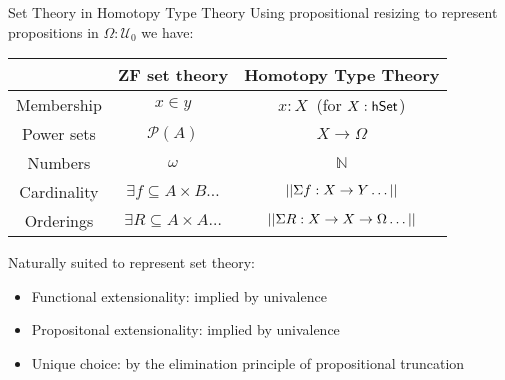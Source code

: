 \documentclass[xcolor=dvipsnames,compress,aspectratio=169]{beamer}
\newcommand{\MBB}[1]{\ensuremath{\mathbb{#1}}\xspace}  %
\newcommand{\MCL}[1]{\ensuremath{\mathcal{#1}}\xspace} %
\newcommand{\Nat}{\MBB{N}}   %
\newcommand{\Pow}{\MCL P}
\newcommand{\Prop}{\MBB P}
\begin{document}
\begin{frame}{Set Theory in Homotopy Type Theory}
	\vspace{0.2cm}
	Using propositional resizing to represent propositions in $\Omega:\mathcal{U}_0$ we have:

	\vspace{0.2cm}
	\begin{center}
	\begin{tabular}{c|c|c}
				&ZF set theory&Homotopy Type Theory\\\hline
				\vphantom{\vdots}Membership&$x\in y$&$x:X~$ (for $X:\mathsf{hSet}$)\\[0.2cm]
				Power sets&$\Pow(A)$&$X\to\Omega$\\[0.2cm]
				Numbers&$\omega$&$\Nat$\\[0.2cm]
				Cardinality&$\exists f\subseteq A\times B\dots$&$||\Sigma f:X\to Y\dots||$\\[0.2cm]
				Orderings&$\exists R\subseteq A\times A\dots$&$||\Sigma R:X\to X\to\Omega\dots||$
	\end{tabular}
	\end{center}
	
	\pause
	\vspace{0.2cm}
	Naturally suited to represent set theory:
	\begin{itemize}
	\item Functional extensionality: implied by univalence
	\item Propositonal extensionality: implied by univalence
	\item Unique choice: by the elimination principle of propositional truncation
	\end{itemize}
	
\end{frame}
\end{document}
